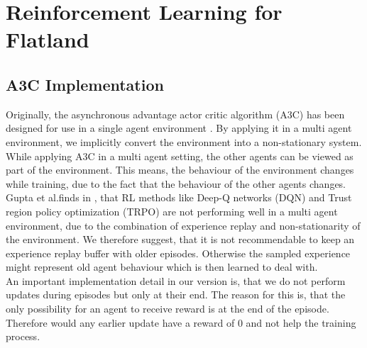 \section[RL for Flatland]{Reinforcement Learning for Flatland}\label{rl_flatland}
\subsection*{A3C Implementation}\label{a3c_implementation}
Originally, the asynchronous advantage actor critic algorithm (A3C) has been designed for use in a single agent environment \cite{a3c}.
By applying it in a multi agent environment, we implicitly convert the environment into a non-stationary system.
While applying A3C in a multi agent setting, the other agents can be viewed as part of the environment. This means, the behaviour of the environment changes while training, due to the fact that the behaviour of the other agents changes.
Gupta et al.finds in \cite{multiagent_comp_a3c_dqn_etc}, that RL methods like Deep-Q networks (DQN) and Trust region policy optimization (TRPO) are not performing well in a multi agent environment, due to the combination of experience replay and non-stationarity of the environment. We therefore suggest, that it is not recommendable to keep an experience replay buffer with older episodes. Otherwise the sampled experience might represent old agent behaviour which is then learned to deal with.\\
An important implementation detail in our version is, that we do not perform updates during episodes but only at their end. The reason for this is, that the only possibility for an agent to receive reward is at the end of the episode. Therefore would any earlier update have a reward of 0 and not help the training process.

